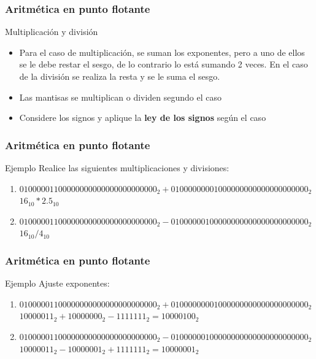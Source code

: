 \documentclass{beamer}
\begin{document}
\begin{frame}
	\frametitle{Aritmética en punto flotante}
	\begin{block}{Multiplicación y división}
	\begin{itemize}
		\item Para el caso de multiplicación, se suman los exponentes, pero a uno de ellos se le debe restar el sesgo, de lo contrario lo está sumando 2 veces. En el caso de la división se realiza la resta y se le suma el sesgo.
		\item Las mantisas se multiplican o dividen segundo el caso
		\item Considere los signos y aplique la \textbf{ley de los signos} según el caso
	\end{itemize}	
	\end{block}
\end{frame}

\begin{frame}
	\frametitle{Aritmética en punto flotante}
	\begin{block}{Ejemplo}
	Realice las siguientes multiplicaciones y divisiones:
	\begin{enumerate}
		\item $01000001100000000000000000000000_{2} + 01000000001000000000000000000000_{2}$ 
		\\ $16_{10} * 2.5_{10}$
		\item $01000001100000000000000000000000_{2} - 01000000100000000000000000000000_{2}$
		\\ $16_{10} / 4_{10}$
	\end{enumerate}	
	\end{block}
\end{frame}

\begin{frame}
	\frametitle{Aritmética en punto flotante}
	\begin{block}{Ejemplo}
	Ajuste exponentes:
	\begin{enumerate}
		\item $0 10000011 00000000000000000000000_{2} + 0 10000000 01000000000000000000000_{2}$ 
		\\ $10000011_{2} + 10000000_{2} - 1111111_{2} = 10000100_{2}$
		\item $0 10000011 00000000000000000000000_{2} - 0 10000001 00000000000000000000000_{2}$
		\\ $10000011_{2} - 10000001_{2} + 1111111_{2} = 10000001_{2}$
	\end{enumerate}	
	\end{block}
\end{frame}
\end{document}
